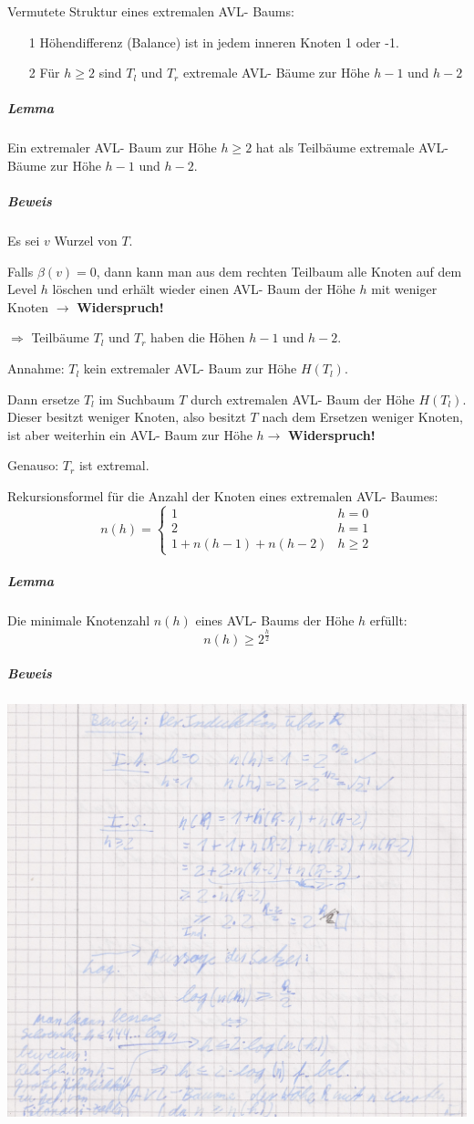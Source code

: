 \documentclass[fleqn]{scrartcl}
\begin{document}
Vermutete Struktur eines extremalen AVL- Baums:
\begin{itemize}
\item[1] Höhendifferenz (Balance) ist in jedem inneren Knoten 1 oder -1.
\item[2] Für $h \geq 2$ sind $T_l$ und $T_r$ extremale AVL- Bäume zur Höhe $h-1$ und $h-2$
\end{itemize}
\subparagraph{Lemma} Ein extremaler AVL- Baum zur Höhe $h \geq 2$ hat als Teilbäume extremale AVL- Bäume zur Höhe $h-1$ und $h-2$.
\subparagraph{Beweis} Es sei $v$ Wurzel von $T$.

Falls $\beta(v) = 0$, dann kann man aus dem rechten Teilbaum alle Knoten auf dem Level $h$ löschen und erhält wieder einen AVL- Baum der Höhe $h$ mit weniger Knoten $\rightarrow$ \textbf{Widerspruch!}

$\Rightarrow$ Teilbäume $T_l$ und $T_r$ haben die Höhen $h-1$ und $h-2$.

Annahme: $T_l$ kein extremaler AVL- Baum zur Höhe $H(T_l)$.

Dann ersetze $T_l$ im Suchbaum $T$ durch extremalen AVL- Baum der Höhe $H(T_l)$. Dieser besitzt weniger Knoten, also besitzt $T$ nach dem Ersetzen weniger Knoten, ist aber weiterhin ein AVL- Baum zur Höhe $h \rightarrow$ \textbf{Widerspruch!}

Genauso: $T_r$ ist extremal.

Rekursionsformel für die Anzahl der Knoten eines extremalen AVL- Baumes:
\[n(h) = \left\{ \begin{array} {ll}
1 & h = 0\\
2 & h = 1\\
1 + n(h-1) + n(h-2) & h \geq 2
\end{array}\right.\]

\subparagraph{Lemma} Die minimale Knotenzahl $n(h)$ eines AVL- Baums der Höhe $h$ erfüllt:
\[n(h) \geq 2^{\frac{h}{2}}\]
\subparagraph{Beweis}
\begin{center}
\includegraphics[width=\textwidth]{./extremaleAVLBaeume}
\end{center}
\end{document}
